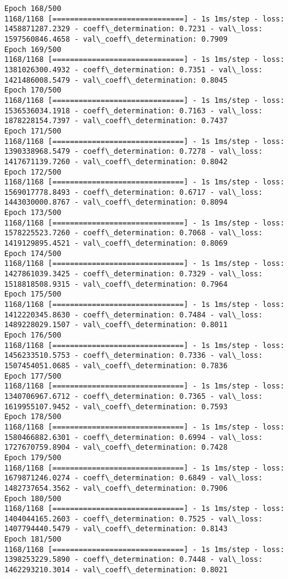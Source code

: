 \documentclass[11pt]{article}
\begin{document}
\begin{Verbatim}[commandchars=\\\{\}]
Epoch 168/500
1168/1168 [==============================] - 1s 1ms/step - loss: 1458871287.2329 - coeff\_determination: 0.7231 - val\_loss: 1597560846.4658 - val\_coeff\_determination: 0.7909
Epoch 169/500
1168/1168 [==============================] - 1s 1ms/step - loss: 1381026300.4932 - coeff\_determination: 0.7351 - val\_loss: 1421486008.5479 - val\_coeff\_determination: 0.8045
Epoch 170/500
1168/1168 [==============================] - 1s 1ms/step - loss: 1536536034.1918 - coeff\_determination: 0.7163 - val\_loss: 1878228154.7397 - val\_coeff\_determination: 0.7437
Epoch 171/500
1168/1168 [==============================] - 1s 1ms/step - loss: 1390338968.5479 - coeff\_determination: 0.7278 - val\_loss: 1417671139.7260 - val\_coeff\_determination: 0.8042
Epoch 172/500
1168/1168 [==============================] - 1s 1ms/step - loss: 1569017778.8493 - coeff\_determination: 0.6717 - val\_loss: 1443030000.8767 - val\_coeff\_determination: 0.8094
Epoch 173/500
1168/1168 [==============================] - 1s 1ms/step - loss: 1578225523.7260 - coeff\_determination: 0.7068 - val\_loss: 1419129895.4521 - val\_coeff\_determination: 0.8069
Epoch 174/500
1168/1168 [==============================] - 1s 1ms/step - loss: 1427861039.3425 - coeff\_determination: 0.7329 - val\_loss: 1518818508.9315 - val\_coeff\_determination: 0.7964
Epoch 175/500
1168/1168 [==============================] - 1s 1ms/step - loss: 1412220345.8630 - coeff\_determination: 0.7484 - val\_loss: 1489228029.1507 - val\_coeff\_determination: 0.8011
Epoch 176/500
1168/1168 [==============================] - 1s 1ms/step - loss: 1456233510.5753 - coeff\_determination: 0.7336 - val\_loss: 1507454051.0685 - val\_coeff\_determination: 0.7836
Epoch 177/500
1168/1168 [==============================] - 1s 1ms/step - loss: 1340706967.6712 - coeff\_determination: 0.7365 - val\_loss: 1619955107.9452 - val\_coeff\_determination: 0.7593
Epoch 178/500
1168/1168 [==============================] - 1s 1ms/step - loss: 1580466882.6301 - coeff\_determination: 0.6994 - val\_loss: 1727670759.8904 - val\_coeff\_determination: 0.7428
Epoch 179/500
1168/1168 [==============================] - 1s 1ms/step - loss: 1679871246.0274 - coeff\_determination: 0.6849 - val\_loss: 1482737654.3562 - val\_coeff\_determination: 0.7906
Epoch 180/500
1168/1168 [==============================] - 1s 1ms/step - loss: 1404044165.2603 - coeff\_determination: 0.7525 - val\_loss: 1407794440.5479 - val\_coeff\_determination: 0.8143
Epoch 181/500
1168/1168 [==============================] - 1s 1ms/step - loss: 1398253229.5890 - coeff\_determination: 0.7448 - val\_loss: 1462293210.3014 - val\_coeff\_determination: 0.8021

\end{Verbatim}
\end{document}
